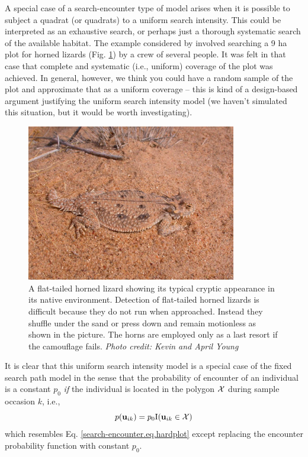 A special case of a search-encounter type of model arises when it is
possible to subject a quadrat (or quadrats) to a uniform search
intensity. This could be interpreted as an exhaustive search, or
perhaps just a thorough systematic search of the available habitat.
The example considered by \citet{royle_young:2008} involved searching
 a 9 ha plot for horned lizards (Fig.
\ref{searchencounter.fig.hornylizard}) by a crew of several people. It
was felt in that case that complete and systematic (i.e., uniform) coverage of the plot was
achieved. In general, however, we think you could have a random sample
of the plot and approximate that as a uniform coverage -- this is kind
of a design-based argument justifying the uniform search intensity
model (we haven't simulated this situation, but it would be worth
investigating).

\begin{figure}[ht]
\centering
\includegraphics[width=3.6in,height=2.7in]{Ch15-searchencounter/figs/horny_lizard.jpg}
\caption{A flat-tailed horned lizard showing its typical cryptic
  appearance in its native environment.  Detection of flat-tailed
  horned lizards is difficult because they do not run when
  approached. Instead they shuffle under the sand or press down and
  remain motionless as shown in the picture.  The horns are employed
  only as a last resort if the camouflage fails.  {\it Photo credit:
    Kevin and April Young} }
\label{searchencounter.fig.hornylizard}
\end{figure}

It is clear that this uniform search intensity model is a special case
of the fixed search path  model in the sense that the
probability of encounter of an individual is a constant $p_{0}$ {\it
  if} the individual is located in the polygon ${\cal X}$ during
sample occasion $k$, i.e.,
\[
p({\bf u}_{ik}) = p_{0} \mbox{I}({\bf u}_{ik} \in {\cal X})
\]
which resembles Eq. \ref{search-encounter.eq.hardplot} except
replacing the encounter probability function with constant $p_{0}$.

